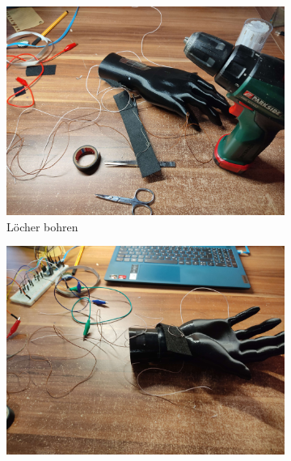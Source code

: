 \documentclass[12pt, a4paper]{article}
\begin{document}
\begin{figure}[h]
	\begin{subfigure}[c]{0.33\textwidth}
		\includegraphics[scale=.037]{assets/Drill_markers.jpg}
		\caption{Löcher bohren}
		\label{fig:Initial_drawing}
	\end{subfigure}
	\begin{subfigure}[c]{0.33\textwidth}
		\includegraphics[scale=.037]{assets/Testing_before_finalizing.jpg}
		\label{fig:Initial_drawing}
	\end{subfigure}
		\begin{subfigure}[c]{0.33\textwidth}

\end{subfigure}
\end{figure}
\end{document}
